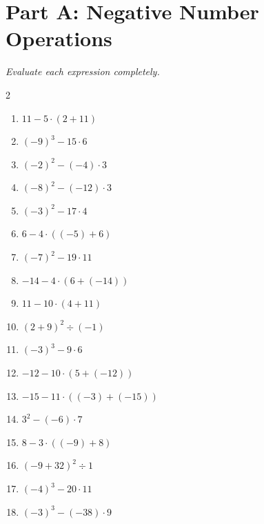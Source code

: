 \documentclass[11pt]{article}
\begin{document}
\section*{Part A: Negative Number Operations}
\noindent\textit{Evaluate each expression completely.}
\begin{multicols}{2}
\begin{enumerate}
  \item $11 - 5 \cdot (2 + 11)$
  \vspace{1.1cm}
  \item $(-9)^{3} - 15 \cdot 6$
  \vspace{1.1cm}
  \item $(-2)^{2} - (-4) \cdot 3$
  \vspace{1.1cm}
  \item $(-8)^{2} - (-12) \cdot 3$
  \vspace{1.1cm}
  \item $(-3)^{2} - 17 \cdot 4$
  \vspace{1.1cm}
  \item $6 - 4 \cdot ((-5) + 6)$
  \vspace{1.1cm}
  \item $(-7)^{2} - 19 \cdot 11$
  \vspace{1.1cm}
  \item $-14 - 4 \cdot (6 + (-14))$
  \vspace{1.1cm}
  \item $11 - 10 \cdot (4 + 11)$
  \vspace{1.1cm}
  \item $(2 + 9)^{2} \div (-1)$
  \vspace{1.1cm}
  \item $(-3)^{3} - 9 \cdot 6$
  \vspace{1.1cm}
  \item $-12 - 10 \cdot (5 + (-12))$
  \vspace{1.1cm}
  \item $-15 - 11 \cdot ((-3) + (-15))$
  \vspace{1.1cm}
  \item $3^{2} - (-6) \cdot 7$
  \vspace{1.1cm}
  \item $8 - 3 \cdot ((-9) + 8)$
  \vspace{1.1cm}
  \item $(-9 + 32)^{2} \div 1$
  \vspace{1.1cm}
  \item $(-4)^{3} - 20 \cdot 11$
  \vspace{1.1cm}
  \item $(-3)^{3} - (-38) \cdot 9$

\end{enumerate}
\end{multicols}
\end{document}
